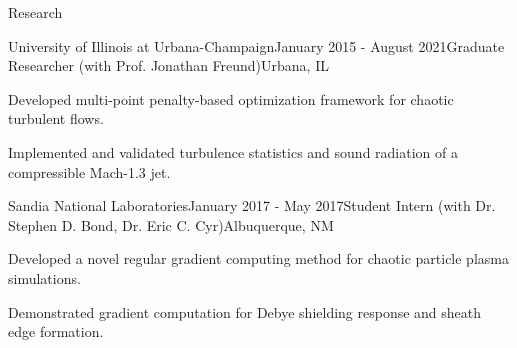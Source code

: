 \documentclass{resume} %
\begin{document}
\begin{rSection}{Research}
\begin{rSubsection}{University of Illinois at Urbana-Champaign}{January 2015 - August 2021}{Graduate Researcher \textnormal{(with Prof. Jonathan Freund)}}{Urbana, IL}
\item Developed multi-point penalty-based optimization framework for chaotic turbulent flows.
\item Implemented and validated turbulence statistics and sound radiation of a compressible Mach-1.3 jet.
\end{rSubsection}

\begin{rSubsection}{Sandia National Laboratories}{January 2017 - May 2017}{Student Intern \textnormal{(with Dr. Stephen D. Bond, Dr. Eric C. Cyr)}}{Albuquerque, NM}
\item Developed a novel regular gradient computing method for chaotic particle plasma simulations.
\item Demonstrated gradient computation for Debye shielding response and sheath edge formation.
\end{rSubsection}

\end{rSection}
\end{document}
